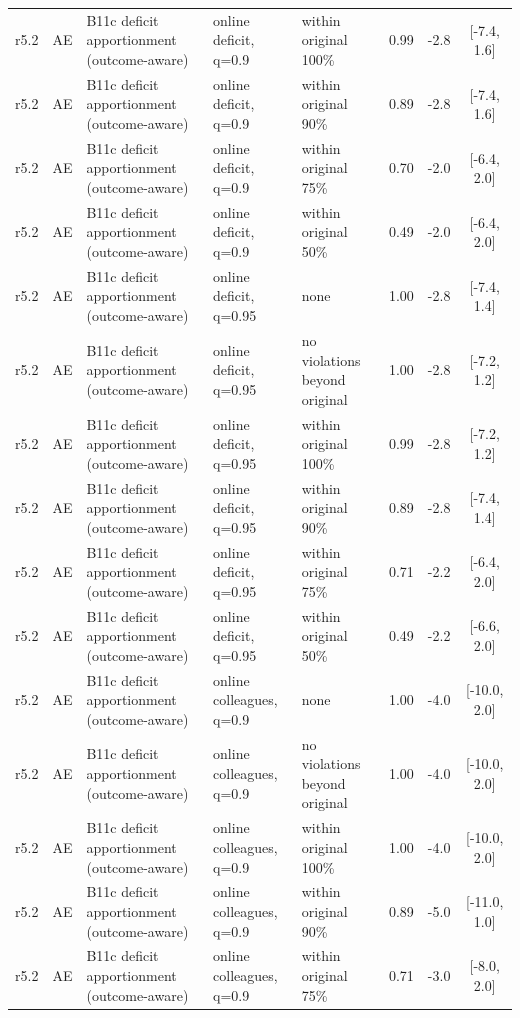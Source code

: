 \begin{longtable}{lllp{4.2cm}p{3.4cm}ccc}
r5.2 & AE & B11c deficit apportionment (outcome-aware) & online deficit, q=0.9 & within original 100\% & 0.99 & -2.8 & [-7.4, 1.6] \\
r5.2 & AE & B11c deficit apportionment (outcome-aware) & online deficit, q=0.9 & within original 90\% & 0.89 & -2.8 & [-7.4, 1.6] \\
r5.2 & AE & B11c deficit apportionment (outcome-aware) & online deficit, q=0.9 & within original 75\% & 0.70 & -2.0 & [-6.4, 2.0] \\
r5.2 & AE & B11c deficit apportionment (outcome-aware) & online deficit, q=0.9 & within original 50\% & 0.49 & -2.0 & [-6.4, 2.0] \\
r5.2 & AE & B11c deficit apportionment (outcome-aware) & online deficit, q=0.95 & none & 1.00 & -2.8 & [-7.4, 1.4] \\
r5.2 & AE & B11c deficit apportionment (outcome-aware) & online deficit, q=0.95 & no violations beyond original & 1.00 & -2.8 & [-7.2, 1.2] \\
r5.2 & AE & B11c deficit apportionment (outcome-aware) & online deficit, q=0.95 & within original 100\% & 0.99 & -2.8 & [-7.2, 1.2] \\
r5.2 & AE & B11c deficit apportionment (outcome-aware) & online deficit, q=0.95 & within original 90\% & 0.89 & -2.8 & [-7.4, 1.4] \\
r5.2 & AE & B11c deficit apportionment (outcome-aware) & online deficit, q=0.95 & within original 75\% & 0.71 & -2.2 & [-6.4, 2.0] \\
r5.2 & AE & B11c deficit apportionment (outcome-aware) & online deficit, q=0.95 & within original 50\% & 0.49 & -2.2 & [-6.6, 2.0] \\
r5.2 & AE & B11c deficit apportionment (outcome-aware) & online colleagues, q=0.9 & none & 1.00 & -4.0 & [-10.0, 2.0] \\
r5.2 & AE & B11c deficit apportionment (outcome-aware) & online colleagues, q=0.9 & no violations beyond original & 1.00 & -4.0 & [-10.0, 2.0] \\
r5.2 & AE & B11c deficit apportionment (outcome-aware) & online colleagues, q=0.9 & within original 100\% & 1.00 & -4.0 & [-10.0, 2.0] \\
r5.2 & AE & B11c deficit apportionment (outcome-aware) & online colleagues, q=0.9 & within original 90\% & 0.89 & -5.0 & [-11.0, 1.0] \\
r5.2 & AE & B11c deficit apportionment (outcome-aware) & online colleagues, q=0.9 & within original 75\% & 0.71 & -3.0 & [-8.0, 2.0] \\

\end{longtable}
